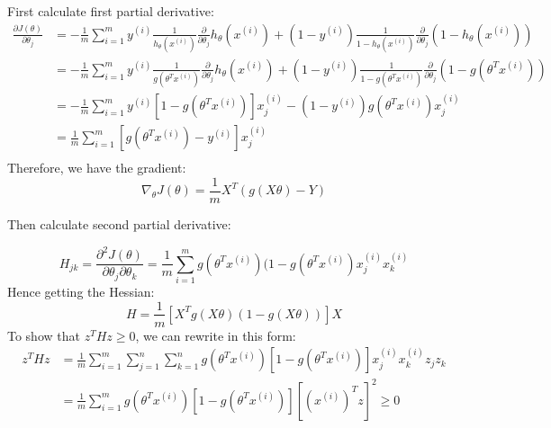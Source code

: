 \begin{answer}
\newline
First calculate first partial derivative:
\begin{equation*}
	\begin{aligned}
		\frac{ \partial J ( \theta )}{\partial \theta _j} &= -\frac{1}{m} \sum_{i=1}^m y^{(i)} \frac{1}{h_\theta(x^{(i)})}\frac{\partial}{\partial \theta _j}h_\theta (x^{(i)}) + (1-y^{(i)}) \frac{1}{1-h_\theta(x^{(i)})}\frac{\partial}{\partial \theta _j}(1-h_\theta(x^{(i)}) ) \\
		&= -\frac{1}{m} \sum_{i=1}^m y^{(i)} \frac{1}{g(\theta ^T x^{(i)})}\frac{\partial}{\partial \theta _j}h_\theta (x^{(i)}) + (1-y^{(i)}) \frac{1}{1-g(\theta ^T x^{(i)})}\frac{\partial}{\partial \theta _j}(1-g(\theta ^T x^{(i)}) ) \\
		&= -\frac{1}{m} \sum_{i=1}^{m}  y^{(i)} \left[1 - g(\theta^T x^{(i)})\right]x^{(i)}_j - (1 - y^{(i)}) g(\theta^T x^{(i)})x^{(i)}_j  \\
		&= \frac{1}{m} \sum_{i=1}^{m} \left[ g(\theta^T x^{(i)}) - y^{(i)} \right]x^{(i)}_j \\
	\end{aligned}
\end{equation*}
Therefore, we have the gradient:
\begin{equation*}
		\nabla _\theta J(\theta) = \frac{1}{m} X^T (g(X \theta) - Y )
\end{equation*}

Then calculate second partial derivative:

\begin{equation*}
		H_{jk} = \frac{\partial^2 J(\theta)}{\partial \theta_j \partial \theta_k} = \frac{1}{m} \sum_{i=1}^m g(\theta ^ T x^{(i)}) (1- g(\theta ^ T x^{(i)}) x_j ^{(i)} x_k ^ {(i)}
\end{equation*}
Hence getting the Hessian:
\begin{equation*}
	H = \frac{1}{m} [X^T g(X\theta) (1-g(X\theta))] X
\end{equation*}
To show that $z^THz \geq 0$, we can rewrite in this form:
\begin{equation*}
	\begin{aligned}
	z^T Hz &= \frac{1}{m} \sum_{i=1}^{m} \sum_{j=1}^{n} \sum_{k=1}^{n} g(\theta^T x^{(i)})[1 - g(\theta^T x^{(i)})]x_j^{(i)}x_k^{(i)}z_j z_k \\
	&= \frac{1}{m} \sum_{i=1}^{m} g(\theta^T x^{(i)})[1 - g(\theta^T x^{(i)})][(x^{(i)})^T z]^2 \geq 0	
	\end{aligned}
\end{equation*}

\end{answer}
